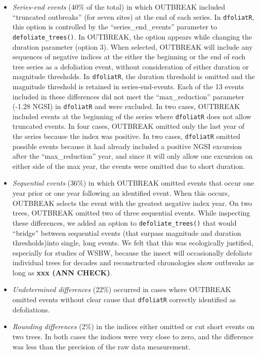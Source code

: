 \documentclass[review]{elsarticle} %
\begin{document}
\begin{itemize}
\item
  \emph{Series-end events} (40\% of the total) in which OUTBREAK included ``truncated outbreaks'' (for seven sites) at the end of each series. In \texttt{dfoliatR}, this option is controlled by the ``series\_end\_events'' parameter to \texttt{defoliate\_trees()}. In OUTBREAK, the option appears while changing the duration parameter (option 3). When selected, OUTBREAK will include any sequences of negative indices at the either the beginning or the end of each tree series as a defoliation event, without consideration of either duration or magnitude thresholds. In \texttt{dfoliatR}, the duration threshold is omitted and the magnitude threshold is retained in series-end-events. Each of the 13 events included in these differences did not meet the ``max\_reduction'' parameter (-1.28 NGSI) in \texttt{dfoliatR} and were excluded. In two cases, OUTBREAK included events at the beginning of the series where \texttt{dfoliatR} does not allow truncated events. In four cases, OUTBREAK omitted only the last year of the series because the index was positive. In two cases, \texttt{dfoliatR} omitted possible events because it had already included a positive NGSI excursion after the ``max\_reduction'' year, and since it will only allow one excursion on either side of the max year, the events were omitted due to short duration.
\item
  \emph{Sequential events} (36\%) in which OUTBREAK omitted events that occur one year prior or one year following an identified event. When this occurs, OUTBREAK selects the event with the greatest negative index year. On two trees, OUTBREAK omitted two of three sequential events. While inspecting these differences, we added an option to \texttt{defoliate\_trees()} that would ``bridge'' between sequential events (that surpass magnitude and duration thresholds)into single, long events. We felt that this was ecologically justified, especially for studies of WSBW, because the insect will occasionally defoliate individual trees for decades and reconstructed chronologies show outbreaks as long as \textbf{xxx (ANN CHECK)}.
\item
  \emph{Undetermined differences} (22\%) occurred in cases where OUTBREAK omitted events without clear cause that \texttt{dfoliatR} correctly identified as defoliations.
\item
  \emph{Rounding differences} (2\%) in the indices either omitted or cut short events on two trees. In both cases the indices were very close to zero, and the difference was less than the precision of the raw data measurement.
\end{itemize}
\end{document}
